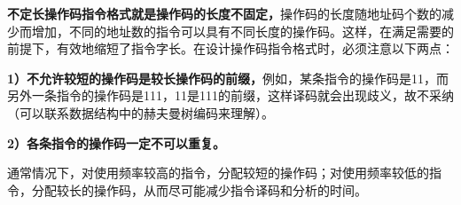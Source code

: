 {\textbf{不定长操作码指令格式就是操作码的长度不固定，}}操作码的长度随地址码个数的减少而增加，不同的地址数的指令可以具有不同长度的操作码。这样，在满足需要的前提下，有效地缩短了指令字长。在设计操作码指令格式时，必须注意以下两点：

\textbf{1）不允许较短的操作码是较长操作码的前缀，}例如，某条指令的操作码是11，而另外一条指令的操作码是111，11是111的前缀，这样译码就会出现歧义，故不采纳（可以联系数据结构中的赫夫曼树编码来理解）。

\textbf{2）各条指令的操作码一定不可以重复。}

通常情况下，对使用频率较高的指令，分配较短的操作码；对使用频率较低的指令，分配较长的操作码，从而尽可能减少指令译码和分析的时间。
